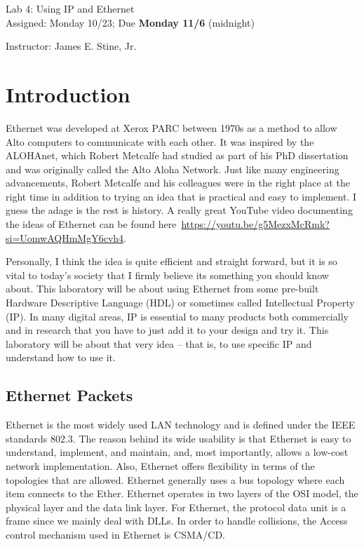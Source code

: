 \documentclass{article}
\newcommand{\myassignment}{Lab 4: Using IP and Ethernet}
\newcommand{\myduedate}{Assigned: Monday 10/23; Due \textbf{Monday 11/6} (midnight)}
\newcommand{\myinstructor}{Instructor: James E. Stine, Jr.}
\begin{document}
\begin{center}
  {\huge \myassignment} \\
  {\large \myduedate} \\
  \begin{flushright}
  \myinstructor \\
  \end{flushright}
\end{center}

\section{Introduction}

Ethernet was developed at Xerox PARC between 1970s as a
method to allow Alto computers to communicate with each other. It
was inspired by the ALOHAnet, which Robert Metcalfe had studied as part of
his PhD dissertation and was originally called the Alto Aloha
Network.  Just like many engineering advancements, Robert Metcalfe and
his colleagues were in the right place at the right time in addition
to trying an idea that is practical and easy to implement.  I guess
the adage is the rest is history.
A really great YouTube video documenting the ideas of Ethernet can be
found here~\url{https://youtu.be/g5MezxMcRmk?si=UomwAQHmMgY6cvh4}.  

Personally, I think the idea is quite efficient and straight forward,
but it is so vital to today's society that I firmly believe its
something you should know about.  This laboratory will be about using
Ethernet from some pre-built Hardware Descriptive Language (HDL) or
sometimes called Intellectual Property (IP).  In many digital areas,
IP is essential to many products both commercially and in research
that you have to just add it to your design and try it.  This
laboratory will be about that very idea -- that is, to use specific IP
and understand how to use it.

\subsection{Ethernet Packets}

Ethernet is the most widely used LAN technology and is defined under
the IEEE standards 802.3. The reason behind its wide usability is that
Ethernet is easy to understand, implement, and maintain, and, most
importantly, allows a
low-cost network implementation. Also, Ethernet offers flexibility in
terms of the topologies that are allowed. Ethernet generally uses a
bus topology where each item connects to the Ether.
Ethernet operates in two layers of the OSI model, the
physical layer and the data link layer. For Ethernet, the protocol
data unit is a frame since we mainly deal with DLLs. In order to
handle collisions, the Access control mechanism used in Ethernet is
CSMA/CD.
\end{document}
